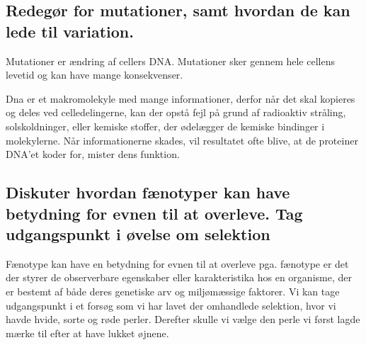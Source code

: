 \subsection*{Redegør for mutationer, samt hvordan de kan lede til variation.}
Mutationer er ændring af cellers DNA. Mutationer sker gennem hele cellens levetid og kan have mange konsekvenser. 

Dna er et makromolekyle med mange informationer, derfor når det skal kopieres og deles ved celledelingerne, kan der opstå fejl på grund af radioaktiv stråling, solskoldninger, eller kemiske stoffer, der ødelægger de kemiske bindinger i molekylerne. Når informationerne skades, vil resultatet ofte blive, at de proteiner DNA'et koder for, mister dens funktion. 

\subsection*{Diskuter hvordan fænotyper kan have betydning for evnen til at overleve. Tag udgangspunkt i øvelse om selektion}
Fænotype kan have en betydning for evnen til at overleve pga. fænotype er det der styrer de observerbare egenskaber eller karakteristika hos en organisme, der er bestemt af både deres genetiske arv og miljømæssige faktorer. Vi kan tage udgangspunkt i et forsøg som vi har lavet der omhandlede selektion, hvor vi havde hvide, sorte og røde perler. Derefter skulle vi vælge den perle vi først lagde mærke til efter at have lukket øjnene. 
